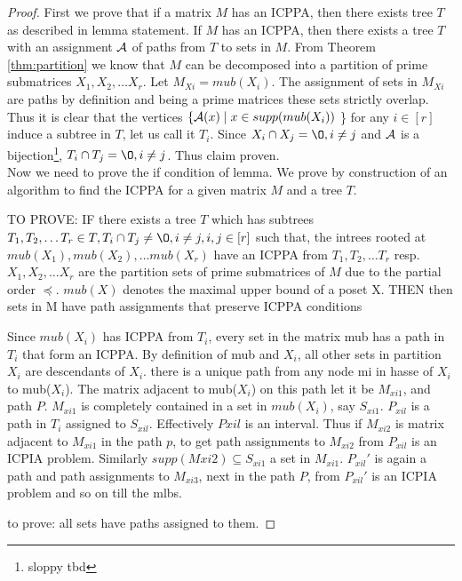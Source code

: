 \documentclass{llncs}
\def\cA{{\cal A}}
\begin{document}
\begin{proof}
  First we prove that if a matrix $M$ has an ICPPA, then there exists
  tree $T$ as described in lemma statement. If $M$ has an ICPPA, then
  there exists a tree $T$ with an assignment $\cA$ of paths from $T$
  to sets in $M$. From Theorem \ref{thm:partition} we know that $M$
  can be decomposed into a partition of prime submatrices $X_1, X_2,
  \dots X_r$.  Let $M_{Xi} = mub(X_i)$. The assignment of sets in
  $M_{Xi}$ are paths by definition and being a prime matrices these sets
  strictly overlap. Thus it is clear that the vertices $\{\cA(x) \mid
  x \in supp(mub(X_i))$ \} for any $i \in [r]$ induce a subtree in
  $T$, let us call it $T_i$. Since $X_i \cap X_j = \O, i \ne j$ and
  $\cA$ is a bijection\footnote{sloppy tbd}, $T_i \cap T_j = \O, i \ne
  j$. Thus
  claim proven.\\

\noindent
Now we need to prove the if condition of lemma. 
We prove by construction of an algorithm to find the ICPPA for a given
matrix $M$ and a tree $T$. 


TO PROVE:
IF
there exists a tree $T$ which has
subtrees $T_1, T_2, \dots T_r \in T, T_i \cap T_j \ne \O, i \ne j, i,j
\in [r]$ such that, the intrees rooted at $mub(X_1), mub(X_2), \dots
mub(X_r)$ have an ICPPA from $T_1, T_2, \dots T_r$ resp. $X_1, X_2,
\dots X_r$ are the partition sets of prime submatrices of $M$ due to the partial
order $\preccurlyeq$. $mub(X)$ denotes the maximal upper bound of a poset
X.
THEN
then sets in M have path assignments that preserve ICPPA conditions

Since $mub(X_i)$ has ICPPA from $T_i$, every set in the matrix mub has a
path in $T_i$ that form an ICPPA. By definition of mub and $X_i$, all other sets
in partition $X_i$ are descendants of $X_i$. there is a unique path from any
node mi in hasse of $X_i$ to mub($X_i$). The matrix adjacent to mub($X_i$) on
this path let it be $M_{xi1}$, and path $P$. $M_{xi1}$ is completely contained in
a set in $mub(X_i)$, say $S_{xi1}$. $P_{xil}$ is a path in $T_i$ assigned to
$S_{xil}$. Effectively $P{xil}$ is an interval. Thus if $M_{xi2}$ is matrix adjacent
to $M_{xi1}$ in the path $p$, to get path assignments to $M_{xi2}$ from $P_{xil}$ is an
ICPIA problem. Similarly $supp(Mxi2) \subseteq S_{xi1}$ a set in
$M_{xi1}$. $P_{xil}'$ is again a path and path assignments to $M_{xi3}$, next in the
path $P$, from $P_{xil}'$ is an ICPIA problem and so on till the mlbs.

to prove: all sets have paths assigned to them. 


  
\end{proof}
\end{document}
